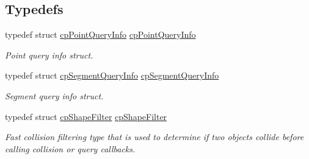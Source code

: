 \subsection*{Typedefs}
\begin{DoxyCompactItemize}
\item 
\hypertarget{group__cp_shape_ga2264ed925aee1f67a414ff773bfe33ff}{}typedef struct \hyperlink{structcp_point_query_info}{cp\+Point\+Query\+Info} \hyperlink{group__cp_shape_ga2264ed925aee1f67a414ff773bfe33ff}{cp\+Point\+Query\+Info}\label{group__cp_shape_ga2264ed925aee1f67a414ff773bfe33ff}

\begin{DoxyCompactList}\small\item\em Point query info struct. \end{DoxyCompactList}\item 
\hypertarget{group__cp_shape_gadebeb6b5e42d369df368fd220aacd7e8}{}typedef struct \hyperlink{structcp_segment_query_info}{cp\+Segment\+Query\+Info} \hyperlink{group__cp_shape_gadebeb6b5e42d369df368fd220aacd7e8}{cp\+Segment\+Query\+Info}\label{group__cp_shape_gadebeb6b5e42d369df368fd220aacd7e8}

\begin{DoxyCompactList}\small\item\em Segment query info struct. \end{DoxyCompactList}\item 
\hypertarget{group__cp_shape_gaa85aa81b58edce2acc7e06316d11875c}{}typedef struct \hyperlink{structcp_shape_filter}{cp\+Shape\+Filter} \hyperlink{group__cp_shape_gaa85aa81b58edce2acc7e06316d11875c}{cp\+Shape\+Filter}\label{group__cp_shape_gaa85aa81b58edce2acc7e06316d11875c}

\begin{DoxyCompactList}\small\item\em Fast collision filtering type that is used to determine if two objects collide before calling collision or query callbacks. \end{DoxyCompactList}\end{DoxyCompactItemize}
